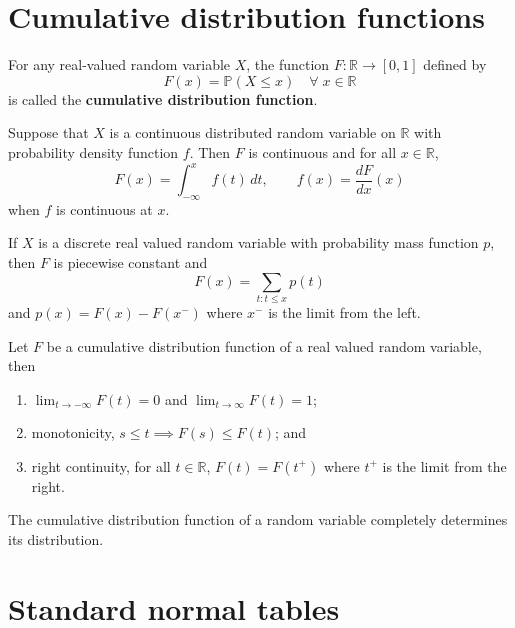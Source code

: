 \section{Cumulative distribution functions}

\begin{definition}
    For any real-valued random variable $X$, the function $F : \mathbb R \to [0, 1]$ defined by \[ F(x) = \mathbb P(X \leq x) \quad \forall \; x \in \mathbb R \] is called the \textbf{cumulative distribution function}.
\end{definition}

\begin{theorem}
    Suppose that $X$ is a continuous distributed random variable on $\mathbb R$ with probability density function $f$. Then $F$ is continuous and for all $x \in \mathbb R$, \[ F(x) = \int_{-\infty}^x f(t) \, dt, \qquad f(x) = \dfrac{dF}{dx}(x) \] when $f$ is continuous at $x$.
\end{theorem}

\begin{theorem}
    If $X$ is a discrete real valued random variable with probability mass function $p$, then $F$ is piecewise constant and \[ F(x) = \sum_{t : t \leq x} p(t) \] and $p(x) = F(x) - F(x^-)$ where $x^-$ is the limit from the left.
\end{theorem}

\begin{theorem}
    Let $F$ be a cumulative distribution function of a real valued random variable, then
    \begin{enumerate}
        \item $\lim_{t \to -\infty} F(t) = 0$ and $\lim_{t \to \infty} F(t) = 1$;
        \item monotonicity, $s \leq t \implies F(s) \leq F(t)$; and
        \item right continuity, for all $t \in \mathbb R$, $F(t) = F(t^+)$ where $t^+$ is the limit from the right.
    \end{enumerate}
\end{theorem}

\begin{theorem}
    The cumulative distribution function of a random variable completely determines its distribution.
\end{theorem}

\section{Standard normal tables}

